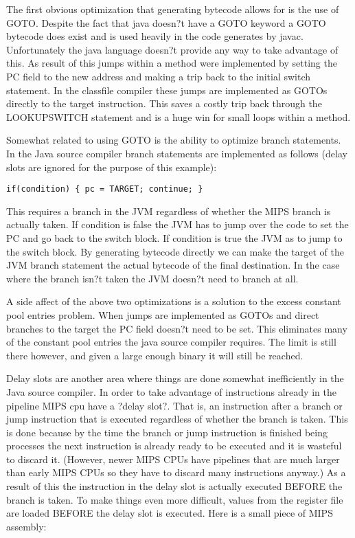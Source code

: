 \documentclass{acmconf}
\begin{document}
The first obvious optimization that generating bytecode allows for is
the use of GOTO. Despite the fact that java doesn?t have a GOTO
keyword a GOTO bytecode does exist and is used heavily in the code
generates by javac. Unfortunately the java language doesn?t provide
any way to take advantage of this. As result of this jumps within a
method were implemented by setting the PC field to the new address and
making a trip back to the initial switch statement.  In the classfile
compiler these jumps are implemented as GOTOs directly to the target
instruction. This saves a costly trip back through the LOOKUPSWITCH
statement and is a huge win for small loops within a method.

Somewhat related to using GOTO is the ability to optimize branch
statements. In the Java source compiler branch statements are
implemented as follows (delay slots are ignored for the purpose of
this example):

{\footnotesize\begin{verbatim}
if(condition) { pc = TARGET; continue; }
\end{verbatim}}

This requires a branch in the JVM regardless of whether the MIPS
branch is actually taken. If condition is false the JVM has to jump
over the code to set the PC and go back to the switch block. If
condition is true the JVM as to jump to the switch block. By
generating bytecode directly we can make the target of the JVM branch
statement the actual bytecode of the final destination. In the case
where the branch isn?t taken the JVM doesn?t need to branch at all.

A side affect of the above two optimizations is a solution to the
excess constant pool entries problem. When jumps are implemented as
GOTOs and direct branches to the target the PC field doesn?t need to
be set. This eliminates many of the constant pool entries the java
source compiler requires. The limit is still there however, and given
a large enough binary it will still be reached.

Delay slots are another area where things are done somewhat
inefficiently in the Java source compiler. In order to take advantage
of instructions already in the pipeline MIPS cpu have a ?delay
slot?. That is, an instruction after a branch or jump instruction that
is executed regardless of whether the branch is taken. This is done
because by the time the branch or jump instruction is finished being
processes the next instruction is already ready to be executed and it
is wasteful to discard it. (However, newer MIPS CPUs have pipelines
that are much larger than early MIPS CPUs so they have to discard many
instructions anyway.) As a result of this the instruction in the delay
slot is actually executed BEFORE the branch is taken. To make things
even more difficult, values from the register file are loaded BEFORE
the delay slot is executed.  Here is a small piece of MIPS assembly:
\end{document}
